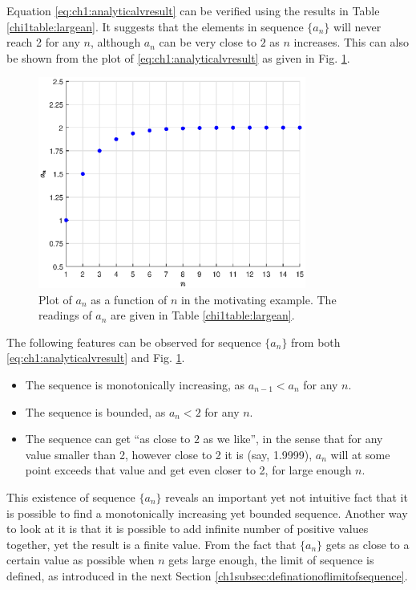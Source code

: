 Equation \eqref{eq:ch1:analyticalvresult} can be verified using the results in Table \ref{chi1table:largean}. It suggests that the elements in sequence $\{a_n\}$ will never reach 2 for any $n$, although $a_n$ can be very close to $2$ as $n$ increases. This can also be shown from the plot of \eqref{eq:ch1:analyticalvresult} as given in Fig. \ref{ch1fig:motivatingexp}.
\begin{figure}
\centering
\includegraphics[width=250pt]{chapters/chapter1/figures/fig_motivatingexp.eps}
\caption{Plot of $a_n$ as a function of $n$ in the motivating example. The readings of $a_n$ are given in Table \ref{chi1table:largean}.} \label{ch1fig:motivatingexp}
\end{figure}

The following features can be observed for sequence $\{a_n\}$ from both \eqref{eq:ch1:analyticalvresult} and Fig. \ref{ch1fig:motivatingexp}.
\begin{itemize}
  \item The sequence is monotonically increasing, as $a_{n-1}<a_n$ for any $n$.
  \item The sequence is bounded, as $a_n<2$ for any $n$.
  \item The sequence can get ``as close to $2$ as we like'', in the sense that for any value smaller than 2, however close to 2 it is (say, 1.9999), $a_n$ will at some point exceeds that value and get even closer to 2, for large enough $n$.
\end{itemize}

This existence of sequence $\{a_n\}$ reveals an important yet not intuitive fact that it is possible to find a monotonically increasing yet bounded sequence. Another way to look at it is that it is possible to add infinite number of positive values together, yet the result is a finite value. From the fact that $\{a_n\}$ gets as close to a certain value as possible when $n$ gets large enough, the limit of sequence is defined, as introduced in the next Section \ref{ch1subsec:definationoflimitofsequence}.

